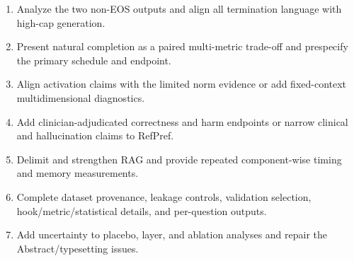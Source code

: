 \documentclass[11pt]{article}
\begin{document}
\begin{enumerate}
    \item Analyze the two non-EOS outputs and align all termination language with high-cap generation.
    \item Present natural completion as a paired multi-metric trade-off and prespecify the primary schedule and endpoint.
    \item Align activation claims with the limited norm evidence or add fixed-context multidimensional diagnostics.
    \item Add clinician-adjudicated correctness and harm endpoints or narrow clinical and hallucination claims to RefPref.
    \item Delimit and strengthen RAG and provide repeated component-wise timing and memory measurements.
    \item Complete dataset provenance, leakage controls, validation selection, hook/metric/statistical details, and per-question outputs.
    \item Add uncertainty to placebo, layer, and ablation analyses and repair the Abstract/typesetting issues.
\end{enumerate}
\end{document}
